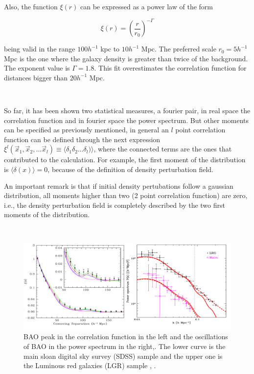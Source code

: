 Also, the function $\xi(r)$ can be expressed as a power law of the form

\begin{equation}
\xi(r) = \left( \frac{r}{r_0} \right)^{-\Gamma}
\label{powlaw}
\end{equation}


being valid in the range $100 h^{-1}$ kpc to $10h^{-1}$ Mpc. The preferred
scale $r_0=5h^{-1}$ Mpc is the one where the galaxy density is greater than twice 
of the background. The exponent value is $\Gamma = 1.8$. This fit overestimates
the correlation function for distances bigger than $20 h^{-1}$ Mpc.  

\
 
So far, it has been shown two statistical measures, a fourier pair, in real space the 
correlation function and in fourier space the power spectrum. 
But other moments can be specified as previously mentioned, in general an $l$ point 
correlation function can be defined through the next expression 
$\xi^l(\vec{x}_1,\vec{x}_2,\ldots \vec{x}_l) \equiv  \langle  \delta_1\delta_2 \ldots\delta_l)\rangle $, where the connected terms are the ones that contributed to the calculation.
For example, the first moment of the distribution is $\langle \delta(x) \rangle = 0$, because 
of the definition of density perturbation field. 

An important remark is that if initial density pertubations follow a gaussian distribution, 
all moments higher than two (2 point correlation function) are zero, i.e., the density
perturbation field is completely described by the two first moments of the distribution. 

\

\begin{figure}[htbp]
       \centering
               \includegraphics[width=1.0\textwidth]{./Images/chapter2/PS_CF_2.png}
       \caption{\small BAO peak in the correlation function in the left and the oscillations of BAO in the power spectrum in the right,\cite{PLOT}.  
       The lower curve is the main sloan digital sky survey (SDSS) sample and the upper one is the  Luminous red galaxies (LGR) sample , \cite{PLOT2}. }
       \label{ps_cf}
 \end{figure}

